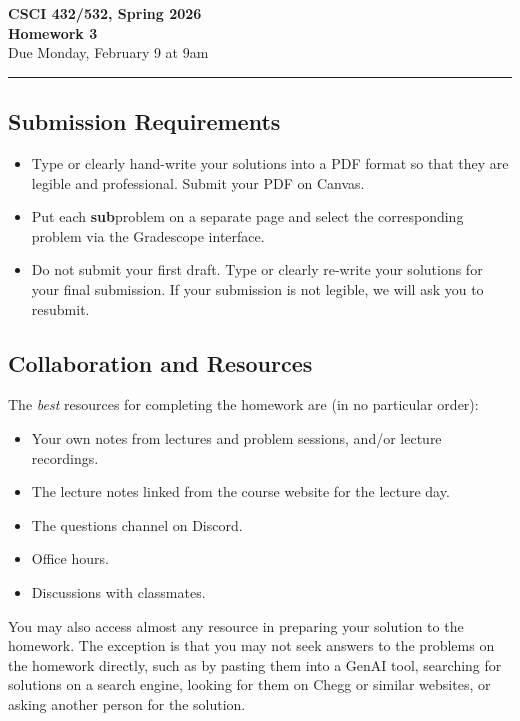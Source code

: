 \documentclass[11pt]{article}
\begin{document}
\begin{center}
\Large\textbf{CSCI 432/532, Spring 2026}%
\\
\LARGE\textbf{Homework 3}%
\\[0.5ex]
\large Due Monday, February 9 at 9am
\end{center}

\bigskip
\hrule
\bigskip

\subsection*{Submission Requirements}
\begin{itemize}
    \item Type or clearly hand-write your solutions into a PDF format so that they are legible and professional. Submit your PDF on Canvas. 
	\item Put each \textbf{sub}problem on a separate page and select the corresponding problem via the Gradescope interface.
    \item Do not submit your first draft. Type or clearly re-write your solutions for your final submission. If your submission is not legible, we will ask you to resubmit.
\end{itemize}

\subsection*{Collaboration and Resources}

The \emph{best} resources for completing the homework are (in no particular order):
\begin{itemize}
	\item Your own notes from lectures and problem sessions, and/or lecture recordings.
	\item The lecture notes linked from the course website for the lecture day.
	\item The questions channel on Discord.
	\item Office hours.
	\item Discussions with classmates.
\end{itemize}
You may also access almost any resource in preparing your solution to the
homework. The exception is that you may not seek answers to the problems on the
homework directly, such as by pasting them into a GenAI tool, searching for
solutions on a search engine, looking for them on Chegg or similar websites, or
asking another person for the solution.
\end{document}
